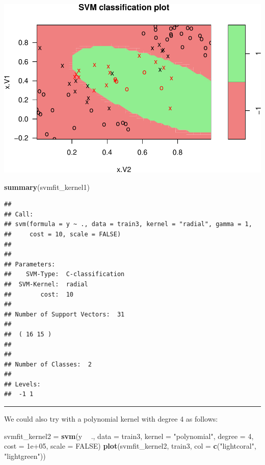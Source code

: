 \documentclass[]{article}
\newenvironment{Shaded}{\begin{snugshade}}{\end{snugshade}}
\newcommand{\DataTypeTok}[1]{\textcolor[rgb]{0.13,0.29,0.53}{#1}}
\newcommand{\DecValTok}[1]{\textcolor[rgb]{0.00,0.00,0.81}{#1}}
\newcommand{\FloatTok}[1]{\textcolor[rgb]{0.00,0.00,0.81}{#1}}
\newcommand{\KeywordTok}[1]{\textcolor[rgb]{0.13,0.29,0.53}{\textbf{#1}}}
\newcommand{\NormalTok}[1]{#1}
\newcommand{\OperatorTok}[1]{\textcolor[rgb]{0.81,0.36,0.00}{\textbf{#1}}}
\newcommand{\OtherTok}[1]{\textcolor[rgb]{0.56,0.35,0.01}{#1}}
\newcommand{\StringTok}[1]{\textcolor[rgb]{0.31,0.60,0.02}{#1}}
\begin{document}
\includegraphics{9SVM_files/figure-latex/unnamed-chunk-21-1.pdf}

\begin{Shaded}
\begin{Highlighting}[]
\KeywordTok{summary}\NormalTok{(svmfit_kernel1)}
\end{Highlighting}
\end{Shaded}

\begin{verbatim}
## 
## Call:
## svm(formula = y ~ ., data = train3, kernel = "radial", gamma = 1, 
##     cost = 10, scale = FALSE)
## 
## 
## Parameters:
##    SVM-Type:  C-classification 
##  SVM-Kernel:  radial 
##        cost:  10 
## 
## Number of Support Vectors:  31
## 
##  ( 16 15 )
## 
## 
## Number of Classes:  2 
## 
## Levels: 
##  -1 1
\end{verbatim}

\normalsize

\begin{center}\rule{0.5\linewidth}{\linethickness}\end{center}

We could also try with a polynomial kernel with degree 4 as follows:

\footnotesize

\begin{Shaded}
\begin{Highlighting}[]
\NormalTok{svmfit_kernel2 =}\StringTok{ }\KeywordTok{svm}\NormalTok{(y }\OperatorTok{~}\StringTok{ }\NormalTok{., }\DataTypeTok{data =}\NormalTok{ train3, }\DataTypeTok{kernel =} \StringTok{"polynomial"}\NormalTok{, }\DataTypeTok{degree =} \DecValTok{4}\NormalTok{, }
    \DataTypeTok{cost =} \FloatTok{1e+05}\NormalTok{, }\DataTypeTok{scale =} \OtherTok{FALSE}\NormalTok{)}
\KeywordTok{plot}\NormalTok{(svmfit_kernel2, train3, }\DataTypeTok{col =} \KeywordTok{c}\NormalTok{(}\StringTok{"lightcoral"}\NormalTok{, }\StringTok{"lightgreen"}\NormalTok{))}
\end{Highlighting}
\end{Shaded}
\end{document}
